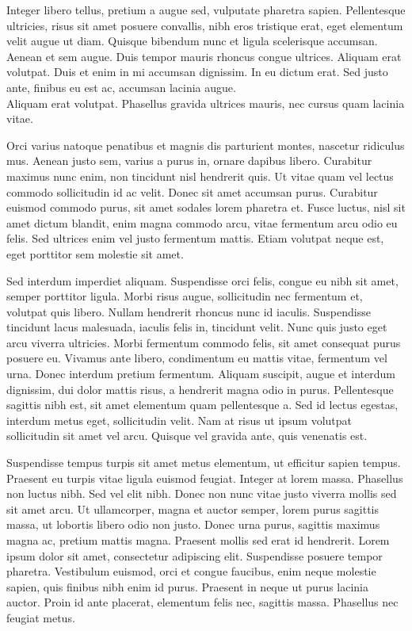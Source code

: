 \documentclass{article}
\begin{document}
Integer libero tellus, pretium a augue sed, vulputate pharetra sapien. Pellentesque ultricies, risus sit amet posuere convallis, nibh eros tristique erat, eget elementum velit augue ut diam. Quisque bibendum nunc et ligula scelerisque accumsan. Aenean et sem augue. Duis tempor mauris rhoncus congue ultrices. Aliquam erat volutpat. Duis et enim in mi accumsan dignissim. In eu dictum erat. Sed justo ante, finibus eu est ac, accumsan lacinia augue.\\
Aliquam erat volutpat. Phasellus gravida ultrices mauris, nec cursus quam lacinia vitae.

Orci varius natoque penatibus et magnis dis parturient montes, nascetur ridiculus mus. Aenean justo sem, varius a purus in, ornare dapibus libero. Curabitur maximus nunc enim, non tincidunt nisl hendrerit quis. Ut vitae quam vel lectus commodo sollicitudin id ac velit. Donec sit amet accumsan purus. Curabitur euismod commodo purus, sit amet sodales lorem pharetra et. Fusce luctus, nisl sit amet dictum blandit, enim magna commodo arcu, vitae fermentum arcu odio eu felis. Sed ultrices enim vel justo fermentum mattis. Etiam volutpat neque est, eget porttitor sem molestie sit amet.

Sed interdum imperdiet aliquam. Suspendisse orci felis, congue eu nibh sit amet, semper porttitor ligula. Morbi risus augue, sollicitudin nec fermentum et, volutpat quis libero. Nullam hendrerit rhoncus nunc id iaculis. Suspendisse tincidunt lacus malesuada, iaculis felis in, tincidunt velit. Nunc quis justo eget arcu viverra ultricies. Morbi fermentum commodo felis, sit amet consequat purus posuere eu. Vivamus ante libero, condimentum eu mattis vitae, fermentum vel urna. Donec interdum pretium fermentum. Aliquam suscipit, augue et interdum dignissim, dui dolor mattis risus, a hendrerit magna odio in purus. Pellentesque sagittis nibh est, sit amet elementum quam pellentesque a. Sed id lectus egestas, interdum metus eget, sollicitudin velit. Nam at risus ut ipsum volutpat sollicitudin sit amet vel arcu. Quisque vel gravida ante, quis venenatis est.

Suspendisse tempus turpis sit amet metus elementum, ut efficitur sapien tempus. Praesent eu turpis vitae ligula euismod feugiat. Integer at lorem massa. Phasellus non luctus nibh. Sed vel elit nibh. Donec non nunc vitae justo viverra mollis sed sit amet arcu. Ut ullamcorper, magna et auctor semper, lorem purus sagittis massa, ut lobortis libero odio non justo. Donec urna purus, sagittis maximus magna ac, pretium mattis magna. Praesent mollis sed erat id hendrerit. Lorem ipsum dolor sit amet, consectetur adipiscing elit. Suspendisse posuere tempor pharetra. Vestibulum euismod, orci et congue faucibus, enim neque molestie sapien, quis finibus nibh enim id purus. Praesent in neque ut purus lacinia auctor. Proin id ante placerat, elementum felis nec, sagittis massa. Phasellus nec feugiat metus.
\end{document}
